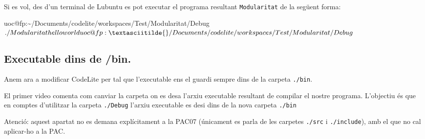 \documentclass[]{book}
\newenvironment{Shaded}{\begin{snugshade}}{\end{snugshade}}
\newcommand{\DecValTok}[1]{\textcolor[rgb]{0.00,0.00,0.81}{#1}}
\newcommand{\NormalTok}[1]{#1}
\begin{document}
\begin{Shaded}
\end{Shaded}

Si es vol, des d'un terminal de Lubuntu es pot executar el programa resultant \texttt{Modularitat} de la següent forma:

\begin{Shaded}
\begin{Highlighting}[]
\NormalTok{uoc@fp:\textasciitilde{}/Documents/codelite/workspaces/Test/Modularitat/Debug$ ./Modularitat}
\NormalTok{hello world}
\NormalTok{uoc@fp:\textasciitilde{}/Documents/codelite/workspaces/Test/Modularitat/Debug$}
\end{Highlighting}
\end{Shaded}

\hypertarget{executable-dins-de-bin.}{%
\subsection{Executable dins de /bin.}\label{executable-dins-de-bin.}}

Anem ara a modificar CodeLite per tal que l'executable ens el guardi sempre dins de la carpeta \texttt{./bin}.

El primer video comenta com canviar la carpeta on es desa l'arxiu executable resultant de compilar el nostre programa. L'objectiu és que en comptes d'utilitzar la carpeta \texttt{./Debug} l'arxiu executable es desi dins de la nova carpeta \texttt{./bin}

Atenció: aquest apartat no es demana explícitament a la PAC07 (únicament es parla de les carpetes \texttt{./src} i \texttt{./include}), amb el que no cal aplicar-ho a la PAC.
\end{document}
